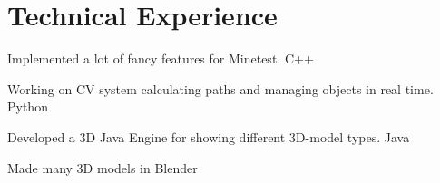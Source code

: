 \documentclass[]{deedy-resume-openfont}
\begin{document}
\vspace{\topsep}
\begin{minipage}[t]{1\textwidth}
\section{Technical Experience}
\begin{tightemize}
\vspace{\topsep}
\large
\item Implemented a lot of fancy features for Minetest. C++
\item Working on CV system calculating paths and managing objects in real time. Python
\item Developed a 3D Java Engine for showing different 3D-model types. Java
\item Made many 3D models in Blender


\end{tightemize}
\sectionsep
\end{minipage}
\end{document}
